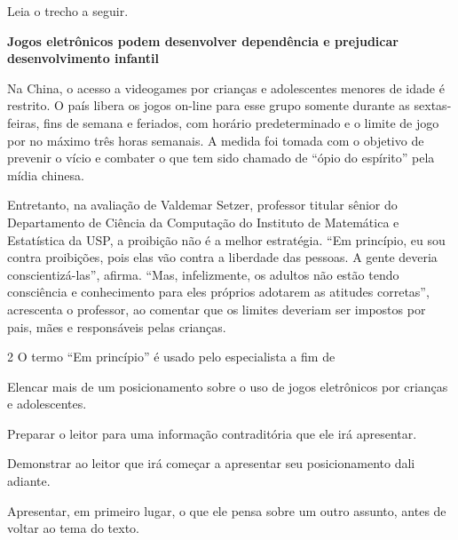 Leia o trecho a seguir.

\begin{myquote}
\begin{center}
\textbf{Jogos eletrônicos podem desenvolver dependência e prejudicar
desenvolvimento infantil}\\
\end{center}

\medskip


\noindent Na China, o acesso a videogames por crianças e adolescentes menores de
idade é restrito. O país libera os jogos on-line para esse grupo somente
durante as sextas-feiras, fins de semana e feriados, com horário
predeterminado e o limite de jogo por no máximo três horas semanais. A
medida foi tomada com o objetivo de prevenir o vício e combater o que
tem sido chamado de ``ópio do espírito'' pela mídia chinesa.

Entretanto, na avaliação de Valdemar Setzer, professor titular sênior do
Departamento de Ciência da Computação do Instituto de Matemática e
Estatística da USP, a proibição não é a melhor estratégia. ``Em
princípio, eu sou contra proibições, pois elas vão contra a liberdade
das pessoas. A gente deveria conscientizá-las'', afirma. ``Mas,
infelizmente, os adultos não estão tendo consciência e conhecimento para
eles próprios adotarem as atitudes corretas'', acrescenta o professor,
ao comentar que os limites deveriam ser impostos por pais, mães e
responsáveis pelas crianças.

\end{myquote}

\num{2} O termo ``Em princípio'' é usado pelo especialista a fim de

\begin{escolha}
\item Elencar mais de um posicionamento sobre o uso de jogos eletrônicos
por crianças e adolescentes.
\item Preparar o leitor para uma informação contraditória que ele irá
apresentar.
\item Demonstrar ao leitor que irá começar a apresentar seu posicionamento
dali adiante.
\item Apresentar, em primeiro lugar, o que ele pensa sobre um outro assunto,
antes de voltar ao tema do texto.
\end{escolha}

